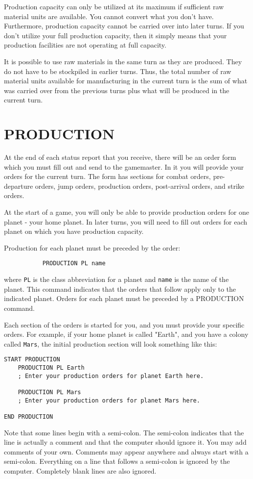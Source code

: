 \documentclass[10pt,titlepage]{article}
\begin{document}
Production capacity can only be utilized at its maximum if sufficient raw
material units are available.  You cannot convert what you don't have.
Furthermore, production capacity cannot be carried over into later turns.  If
you don't utilize your full production capacity, then it simply means that
your production facilities are not operating at full capacity.

It is possible to use raw materials in the same turn as they are produced.
They do not have to be stockpiled in earlier turns.  Thus, the total number of
raw material units available for manufacturing in the current turn is the sum
of what was carried over from the previous turns plus what will be produced in
the current turn.



\section{PRODUCTION}
\label{sec:production}

At the end of each status report that you receive, there will be an order form
which you must fill out and send to the gamemaster.  In it you will provide
your orders for the current turn.  The form has sections for combat orders,
pre-departure orders, jump orders, production orders, post-arrival orders,
and strike orders.

At the start of a game, you will only be able to provide production orders
for one planet - your home planet.  In later turns, you will need to fill
out orders for each planet on which you have production capacity.

Production for each planet must be preceded by the order:
\begin{verbatim}
           PRODUCTION PL name
\end{verbatim}
where \texttt{PL} is the class abbreviation for a planet and \texttt{name} is the name of the
planet.  This command indicates that the orders that follow apply only to the
indicated planet.  Orders for each planet must be preceded by a PRODUCTION
command.

Each section of the orders is started for you, and you must provide your
specific orders.  For example, if your home planet is called "Earth", and you
have a colony called \texttt{Mars}, the initial production section will look something
like this:
\begin{verbatim}
START PRODUCTION
    PRODUCTION PL Earth
    ; Enter your production orders for planet Earth here.

    PRODUCTION PL Mars
    ; Enter your production orders for planet Mars here.

END PRODUCTION
\end{verbatim}
Note that some lines begin with a semi-colon.  The semi-colon indicates that
the line is actually a comment and that the computer should ignore it.  You may
add comments of your own.  Comments may appear anywhere and always start with a
semi-colon.  Everything on a line that follows a semi-colon is ignored by the
computer.  Completely blank lines are also ignored.
\end{document}
